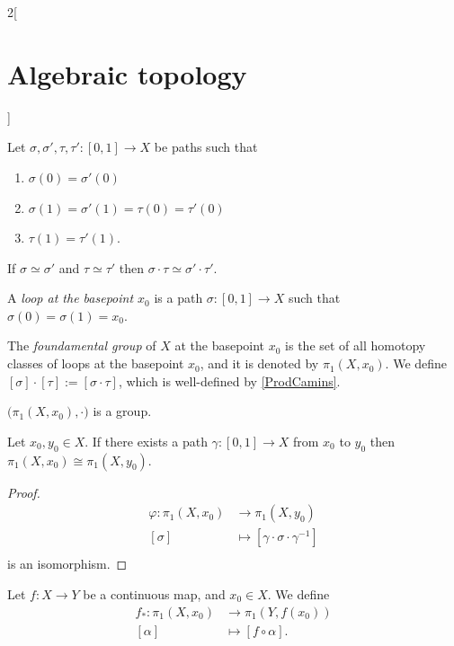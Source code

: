 \documentclass[../../../main.tex]{subfiles}
\begin{document}
\begin{multicols}{2}[\section{Algebraic topology}]
\begin{definition}
	\end{definition}

	\begin{lemma}\label{ProdCamins}
		Let $\sigma, \sigma', \tau, \tau':[0,1]\to X$ be paths such that 
		\begin{enumerate}
			\item $\sigma(0)=\sigma'(0)$
			\item $\sigma(1)=\sigma'(1)=\tau(0)=\tau'(0)$
			\item $\tau(1)=\tau'(1)$.
		\end{enumerate}
		If $\sigma \simeq \sigma'$ and $\tau \simeq \tau'$ then $\sigma \cdot \tau \simeq \sigma' \cdot \tau'$.
	\end{lemma}

	
	\begin{definition}
		A \emph{loop at the basepoint $x_0$} is a path $\sigma: [0,1]\to X$ such that $\sigma(0)=\sigma(1)=x_0$.
	\end{definition}

	\begin{definition}
		The \emph{foundamental group} of $X$ at the basepoint $x_0$ is the set of all homotopy classes of loops at the basepoint $x_0$, and it is denoted by $\pi_1 (X,x_0)$. We define $[\sigma]\cdot [\tau]:=[\sigma \cdot \tau]$, which is well-defined by \cref{ProdCamins}.
	\end{definition}

	\begin{proposition}
		$\big(\pi_1(X,x_0), \cdot \big)$ is a group.
	\end{proposition}
	
	\begin{proposition}
		Let $x_0, y_0 \in X$. If there exists a path $\gamma: [0,1] \to X$ from $x_0$ to $y_0$ then $\pi_1 (X,x_0) \cong \pi_1 (X,y_0)$.
	\end{proposition}
	
	\begin{proof}
		\begin{align*}
			\varphi: \pi_1(X,x_0) &\longrightarrow \pi_1(X,y_0) \\
			[\sigma]&\longmapsto [\gamma \cdot \sigma \cdot \gamma^{-1}]\\
		\end{align*}
		is an isomorphism.
	\end{proof}
	
	\begin{definition}
		Let $f:X\to Y$ be a continuous map, and $x_0 \in X$. We define 
		\begin{align*}
			f_*: \pi_1 (X,x_0) & \longrightarrow \pi_1 (Y,f(x_0)) \\
			[\alpha] &\longmapsto [f\circ \alpha].
		\end{align*}
		

\end{definition}
\end{multicols}
\end{document}
